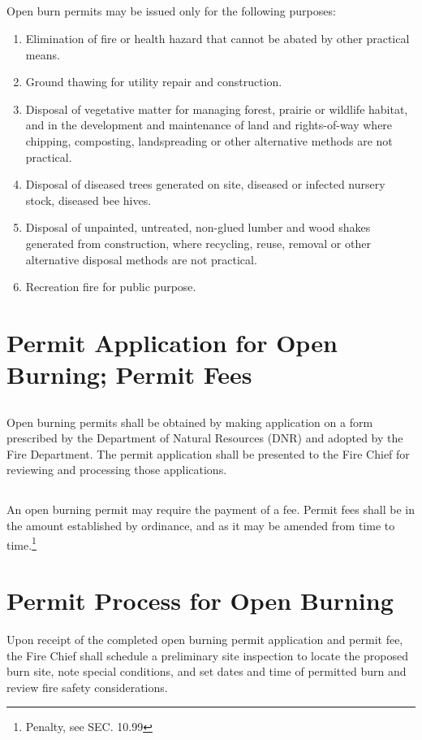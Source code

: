 \subsection{}
Open burn permits may be issued only for the following purposes:
\begin{enumerate}[{\indent}1)]
    \item Elimination of fire or health hazard that cannot be abated by other practical means.
    \item Ground thawing for utility repair and construction.
    \item Disposal of vegetative matter for managing forest, prairie or wildlife habitat, and in the development and maintenance of land and rights-of-way where chipping, composting, landspreading or other alternative methods are not practical.
    \item Disposal of diseased trees generated on site, diseased or infected nursery stock, diseased bee hives.
    \item Disposal of unpainted, untreated, non-glued lumber and wood shakes generated from construction, where recycling, reuse, removal or other alternative disposal methods are not practical.
    \item Recreation fire for public purpose.
\end{enumerate}

\section{Permit Application for Open Burning; Permit Fees}
\subsection{}
Open burning permits shall be obtained by making application on a form prescribed by the Department of Natural Resources (DNR) and adopted by the Fire Department.  The permit application shall be presented to the Fire Chief for reviewing and processing those applications.
\subsection{}
An open burning permit may require the payment of a fee.  Permit fees shall be in the amount established by ordinance, and as it may be amended from time to time.\footnote{Penalty, see SEC. 10.99}

\section{Permit Process for Open Burning}
Upon receipt of the completed open burning permit application and permit fee, the Fire Chief shall schedule a preliminary site inspection to locate the proposed burn site, note special conditions, and set dates and time of permitted burn and review fire safety considerations.

